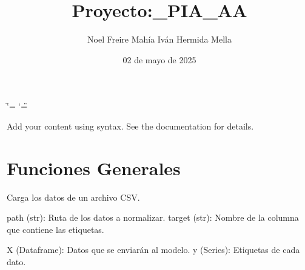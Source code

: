 \documentclass[letterpaper,10pt,spanish]{sphinxmanual}
\title{Proyecto:\_PIA\_AA}
\date{02 de mayo de 2025}
\author{Noel Freire Mahía 
 Iván Hermida Mella}
\begin{document}
\ifdefined\shorthandoff
  \ifnum\catcode`\=\string=\active\shorthandoff{=}\fi
  \ifnum\catcode`\"=\active{}\fi
\fi

\pagestyle{empty}
\sphinxmaketitle
\pagestyle{plain}
\sphinxtableofcontents
\pagestyle{normal}
\label{\detokenize{index::doc}}


\sphinxAtStartPar
Add your content using  syntax. See the
documentation for details.

\sphinxstepscope


\chapter{Funciones Generales}
\label{\detokenize{Funciones_Generales:module-subir_datos}}\label{\detokenize{Funciones_Generales:funciones-generales}}\label{\detokenize{Funciones_Generales::doc}}

\begin{fulllineitems}
\label{\detokenize{Funciones_Generales:subir_datos.cargar_datos}}
\pysigstartsignatures
\pysiglinewithargsret
{}
{\sphinxparamcomma {}}
{}
\pysigstopsignatures
\sphinxAtStartPar
Carga los datos de un archivo CSV.
\begin{description}
\sphinxAtStartPar
path (str): Ruta de los datos a normalizar.
target (str): Nombre de la columna que contiene las etiquetas.

\sphinxAtStartPar
X (Dataframe): Datos que se enviarán al modelo.
y (Series): Etiquetas de cada dato.

\end{description}

\end{fulllineitems}

\label{\detokenize{Funciones_Generales:module-normalizar}}
\end{document}
